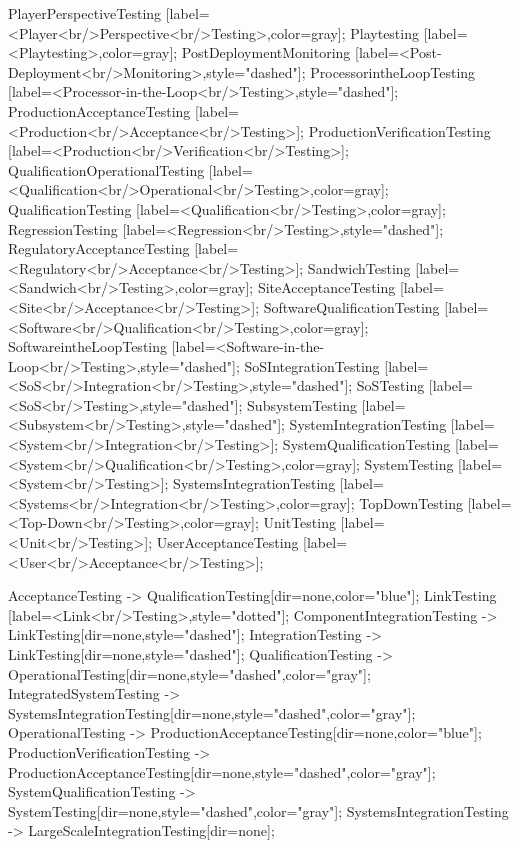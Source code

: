\documentclass{article}
\begin{document}
{PlayerPerspectiveTesting [label=<Player<br/>Perspective<br/>Testing>,color=gray];
Playtesting [label=<Playtesting>,color=gray];
PostDeploymentMonitoring [label=<Post-Deployment<br/>Monitoring>,style="dashed"];
ProcessorintheLoopTesting [label=<Processor-in-the-Loop<br/>Testing>,style="dashed"];
ProductionAcceptanceTesting [label=<Production<br/>Acceptance<br/>Testing>];
ProductionVerificationTesting [label=<Production<br/>Verification<br/>Testing>];
QualificationOperationalTesting [label=<Qualification<br/>Operational<br/>Testing>,color=gray];
QualificationTesting [label=<Qualification<br/>Testing>,color=gray];
RegressionTesting [label=<Regression<br/>Testing>,style="dashed"];
RegulatoryAcceptanceTesting [label=<Regulatory<br/>Acceptance<br/>Testing>];
SandwichTesting [label=<Sandwich<br/>Testing>,color=gray];
SiteAcceptanceTesting [label=<Site<br/>Acceptance<br/>Testing>];
SoftwareQualificationTesting [label=<Software<br/>Qualification<br/>Testing>,color=gray];
SoftwareintheLoopTesting [label=<Software-in-the-Loop<br/>Testing>,style="dashed"];
SoSIntegrationTesting [label=<SoS<br/>Integration<br/>Testing>,style="dashed"];
SoSTesting [label=<SoS<br/>Testing>,style="dashed"];
SubsystemTesting [label=<Subsystem<br/>Testing>,style="dashed"];
SystemIntegrationTesting [label=<System<br/>Integration<br/>Testing>];
SystemQualificationTesting [label=<System<br/>Qualification<br/>Testing>,color=gray];
SystemTesting [label=<System<br/>Testing>];
SystemsIntegrationTesting [label=<Systems<br/>Integration<br/>Testing>,color=gray];
TopDownTesting [label=<Top-Down<br/>Testing>,color=gray];
UnitTesting [label=<Unit<br/>Testing>];
UserAcceptanceTesting [label=<User<br/>Acceptance<br/>Testing>];

AcceptanceTesting -> QualificationTesting[dir=none,color="blue"];
LinkTesting [label=<Link<br/>Testing>,style="dotted"];
ComponentIntegrationTesting -> LinkTesting[dir=none,style="dashed"];
IntegrationTesting -> LinkTesting[dir=none,style="dashed"];
QualificationTesting -> OperationalTesting[dir=none,style="dashed",color="gray"];
IntegratedSystemTesting -> SystemsIntegrationTesting[dir=none,style="dashed",color="gray"];
OperationalTesting -> ProductionAcceptanceTesting[dir=none,color="blue"];
ProductionVerificationTesting -> ProductionAcceptanceTesting[dir=none,style="dashed",color="gray"];
SystemQualificationTesting -> SystemTesting[dir=none,style="dashed",color="gray"];
SystemsIntegrationTesting -> LargeScaleIntegrationTesting[dir=none];

}
\end{document}

